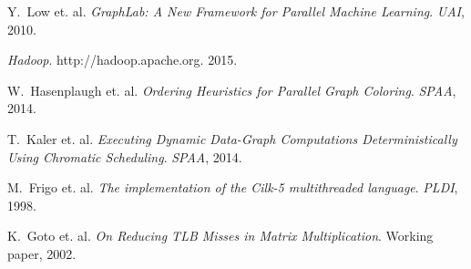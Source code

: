 \documentclass[journal]{IEEEtran}
\begin{document}
\begin{thebibliography}{1}
Y.~Low et. al. \emph{GraphLab: A New Framework for Parallel Machine Learning}. \textit{UAI}, 2010.

\emph{Hadoop}. http://hadoop.apache.org. 2015.

W.~Hasenplaugh et. al. \emph{Ordering Heuristics for Parallel Graph Coloring}. \textit{SPAA}, 2014.

T.~Kaler et. al. \emph{Executing Dynamic Data-Graph Computations Deterministically Using Chromatic Scheduling}. \textit{SPAA}, 2014.

M.~Frigo et. al. \emph{The implementation of the Cilk-5 multithreaded language}. \textit{PLDI}, 1998.

K.~Goto et. al. \emph{On Reducing TLB Misses in Matrix Multiplication}. Working paper, 2002.

\end{thebibliography}
\end{document}
